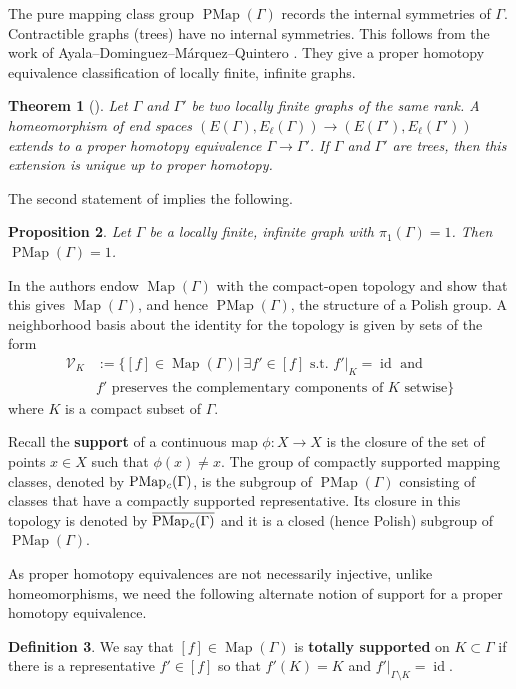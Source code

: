 \documentclass[11pt]{amsart}
\theoremstyle{plain}
\newtheorem{THM}{Theorem}[section]
\newtheorem{PROP}[THM]{Proposition}
\theoremstyle{definition}
\newtheorem{DEF}[THM]{Definition}
\DeclareMathOperator{\id}{id}
\DeclareMathOperator{\PMap}{PMap}
\DeclareMathOperator{\PMapc}{PMap_{\it c}}
\DeclareMathOperator{\Map}{Map}
\newcommand{\cV}{\mathcal{V}}
\def\G{{\Gamma}}
\newcommand{\defeq}{:=}
\newcommand{\<}{\langle}
\renewcommand{\>}{\rangle}
\begin{document}
The pure mapping class group $\PMap(\G)$ records the internal symmetries of
$\G$. Contractible graphs (trees) have no internal
symmetries. This follows from the work of Ayala--Dominguez--M{\'a}rquez--Quintero \cite{ayala1990proper}. They give a proper homotopy equivalence classification of locally finite, infinite graphs.

\begin{THM}[{\cite[Theorem 2.7]{ayala1990proper}}] \label{thm:PHEclassification}
    Let $\G$ and $\G'$ be two locally finite graphs of the same rank. A homeomorphism of end spaces $(E(\G),E_\ell(\G)) \to (E(\G'),E_\ell(\G'))$ extends to a proper homotopy equivalence $\G \to \G'$. If $\G$ and $\G'$ are trees, then this extension is unique up to proper homotopy.
\end{THM}

The second statement of  implies the following.

\begin{PROP}
\label{prop:treePMap}
  Let $\G$ be a locally finite, infinite graph with $\pi_1(\G)=1$. Then $\PMap(\G)=1$.
\end{PROP}

In \cite{AB2021} the authors endow $\Map(\G)$ with the compact-open topology and show that this gives $\Map(\G)$, and hence $\PMap(\G)$, the structure of a Polish group. A neighborhood basis about the identity for the topology is given by sets of the form 
\begin{align*}
    \cV_{K} &\defeq \{[f] \in \Map(\G)\vert~ \exists f' \in [f] \text{ s.t. } f'\vert_{K} = \id \text{ and } \\ &f' \text{ preserves the complementary components of $K$ setwise}\}
\end{align*}
where $K$ is a compact subset of $\G$. 

Recall the \textbf{support} of a continuous map $\phi:X \to X$ is the closure of the set of points $x \in X$ such that $\phi(x) \neq x$. The group of compactly supported mapping classes, denoted by $\PMapc(\G)$, is the subgroup of $\PMap(\G)$ consisting of classes that have a compactly supported representative. Its closure in this topology is denoted by $\overline{\PMapc(\G)}$ and it is a closed (hence Polish) subgroup of $\PMap(\G)$. 

As proper homotopy equivalences are not necessarily injective, unlike homeomorphisms, we need the following alternate notion of support for a proper homotopy equivalence.
\begin{DEF}
    We say that $[f] \in \Map(\G)$ is \textbf{totally supported} on $K \subset \G$ if there is a representative $f' \in [f]$ so that $f'(K) = K$ and $f'\vert_{\G \setminus K} = \id$. 
\end{DEF}
\end{document}
